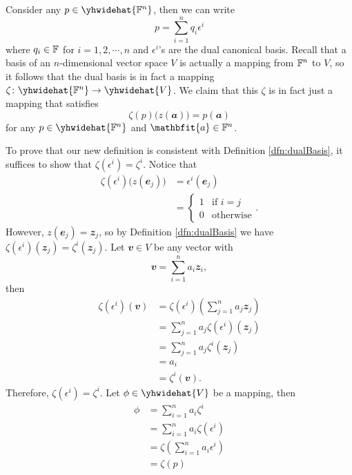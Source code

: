 \documentclass[math, code]{amznotes}
\theoremstyle{remark}
\begin{document}
Consider any $p \in \yhwidehat{\F^n}$, then we can write
\begin{equation*}
    p = \sum_{i = 1}^{n}q_i\epsilon^i
\end{equation*} 
where $q_i \in \mathbb{F}$ for $i = 1, 2, \cdots, n$ and $\epsilon^i$'s are the dual canonical basis. Recall that a basis of an $n$-dimensional vector space $V$ is actually a mapping from $\mathbb{F}^n$ to $V$, so it follows that the dual basis is in fact a mapping $\zeta \colon \yhwidehat{\F^n} \to \yhwidehat{V}$. We claim that this $\zeta$ is in fact just a mapping that satisfies 
\begin{equation*}
    \zeta(p)\bigl(z(\mathbfit{a})\bigr) = p(\mathbfit{a})
\end{equation*}
for any $p \in \yhwidehat{\F^n}$ and $\mathbfit{a} \in \F^n$. 

To prove that our new definition is consistent with Definition \ref{dfn:dualBasis}, it suffices to show that $\zeta(\epsilon^i) = \zeta^i$. Notice that
\begin{align*}
    \zeta(\epsilon^i)\bigl(z(\mathbfit{e}_j)\bigr) & = \epsilon^i(\mathbfit{e}_j) \\
    & = \begin{cases}
        1 & \textrm{if } i = j \\
        0 & \textrm{otherwise}
    \end{cases}.
\end{align*}
However, $z(\mathbfit{e}_j) = \mathbfit{z}_j$, so by Definition \ref{dfn:dualBasis} we have $\zeta(\epsilon^i)(\mathbfit{z}_j) = \zeta^i(\mathbfit{z}_j)$. Let $\mathbfit{v} \in V$ be any vector with
\begin{equation*}
    \mathbfit{v} = \sum_{i = 1}^{n}a_i\mathbfit{z}_i,
\end{equation*}
then 
\begin{align*}
    \zeta(\epsilon^i)(\mathbfit{v}) & = \zeta(\epsilon^i)\left(\sum_{j = 1}^{n}a_j\mathbfit{z}_j\right) \\
    & = \sum_{j = 1}^{n}a_j\zeta(\epsilon^i)(\mathbfit{z}_j) \\
    & = \sum_{j = 1}^{n}a_j\zeta^i(\mathbfit{z}_j) \\
    & = a_i \\
    & = \zeta^i(\mathbfit{v}).
\end{align*}
Therefore, $\zeta(\epsilon^i) = \zeta^i$. Let $\phi \in \yhwidehat{V}$ be a mapping, then
\begin{align*}
    \phi & = \sum_{i = 1}^{n}a_i\zeta^i \\
    & = \sum_{i = 1}^{n}a_i\zeta(\epsilon^i) \\
    & = \zeta\left(\sum_{i = 1}^{n}a_i\epsilon^i\right) \\
    & = \zeta(p)
\end{align*}
\end{document}
